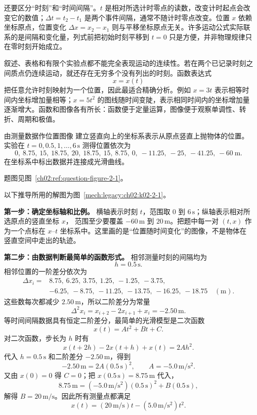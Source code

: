 {还要区分“时刻”和“时间间隔”。$t$ 是相对所选计时零点的读数，改变计时起点会改变它的数值；$\Delta t=t_2-t_1$ 是两个事件间隔，通常不随计时零点改变。位置 $x$ 依赖坐标原点，位置变化 $\Delta x=x_2-x_1$ 则与平移坐标原点无关。许多运动公式实际联系的是间隔和变化量，列式前把初始时刻平移到 $t=0$ 只是方便，并非物理规律只在零时刻开始成立。

叙述、表格和有限个实验点都不能完全表现运动的连续性。若在两个已记录时刻之间质点仍连续运动，就还存在无穷多个没有列出的时刻。函数表达式
\begin{equation}
  x=x(t)
\end{equation}
把任意允许时刻映射为一个位置，因此最适合精确分析。例如 $x=3t$ 表示相等时间内坐标增加量相等；$x=5t^2$ 的图线随时间变陡，表示相同时间内的坐标增加量逐渐增大。函数和图像各有所长：函数便于定量运算，图像便于观察单调性、转折、周期和极值。

\begin{origexamplebox}{由测量数据作位置图像}\label{ch02:ex:k02-2-1}
建立竖直向上的坐标系表示从原点竖直上抛物体的位置。实验在 $t=0,0.5,1,\ldots,6\,\mathrm{s}$ 测得位置依次为
\[
0,\ 8.75,\ 15,\ 18.75,\ 20,\ 18.75,\ 15,\ 8.75,\ 0,\ -11.25,\ -25,\ -41.25,\ -60\ \mathrm{m}.
\]
在坐标系中标出数据并连接成光滑曲线。
\par 题图见图~\ref{ch02:ref:question-figure-2-1}。
\KQuestionAB
\end{origexamplebox}
\begin{xesolution}
以下推导所用的解图为图~\ref{mech:legacy:ch02:k02-2-1}。

\textbf{第一步：确定坐标轴和比例。}
横轴表示时刻 $t$，范围取 $0$ 到 $6\,\mathrm{s}$；纵轴表示相对所选原点的竖直坐标 $x$，
范围至少要覆盖 $-60\,\mathrm{m}$ 到 $20\,\mathrm{m}$。把题中每一对 $(t,x)$ 作为一个点标在
$x$--$t$ 坐标系中。这里画的是“位置随时间变化”的图像，不是物体在竖直空间中走出的轨迹。

\textbf{第二步：由数据判断最简单的函数形式。}
相邻测量时刻的间隔均为
\[
 h=0.5\,\mathrm{s}.
\]
相邻位置的一阶差分依次为
\[
\begin{aligned}
\Delta x_i={}&8.75,\ 6.25,\ 3.75,\ 1.25,\ -1.25,\ -3.75,\\
              &-6.25,\ -8.75,\ -11.25,\ -13.75,\ -16.25,\ -18.75
              \quad(\mathrm m).
\end{aligned}
\]
这些数每次都减少 $2.50\,\mathrm m$，所以二阶差分为常量
\[
 \Delta^2x_i=x_{i+2}-2x_{i+1}+x_i=-2.50\,\mathrm m.
\]
等时间间隔数据具有恒定二阶差分，最简单的光滑模型是二次函数
\[
 x(t)=At^2+Bt+C.
\]
对二次函数，步长为 $h$ 时有
\[
 x(t+2h)-2x(t+h)+x(t)=2Ah^2.
\]
代入 $h=0.5\,\mathrm s$ 和二阶差分 $-2.50\,\mathrm m$，得到
\[
 -2.50\,\mathrm m=2A(0.5\,\mathrm s)^2,
 \qquad A=-5.0\,\mathrm{m/s^2}.
\]
又由 $x(0)=0$ 得 $C=0$；把 $x(0.5\,\mathrm s)=8.75\,\mathrm m$ 代入，
\[
 8.75\,\mathrm m
 =(-5.0\,\mathrm{m/s^2})(0.5\,\mathrm s)^2
 +B(0.5\,\mathrm s),
\]
解得 $B=20\,\mathrm{m/s}$。因此所有测量点都满足
\[
 \boxed{x(t)=(20\,\mathrm{m/s})t-(5.0\,\mathrm{m/s^2})t^2}.
\]


\end{xesolution}}
